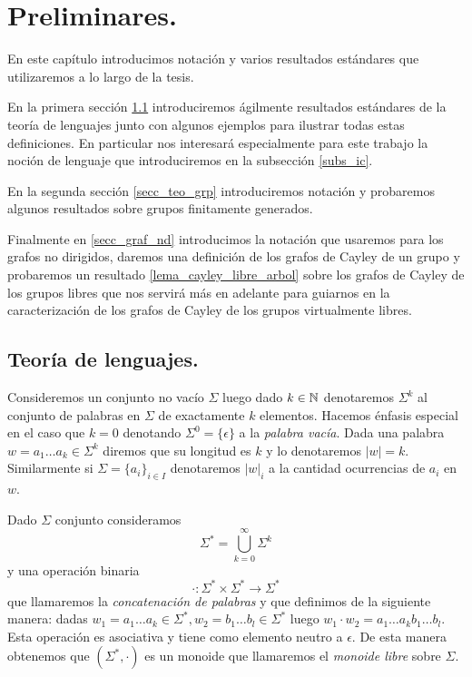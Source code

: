 \documentclass[tesis.tex]{subfiles}
\begin{document}
\chapter{Preliminares.}


En este capítulo introducimos notación y varios resultados estándares que utilizaremos a lo largo de la tesis.

En la primera sección \ref{secc_tlen} introduciremos ágilmente resultados estándares de la teoría de lenguajes junto con algunos ejemplos para ilustrar todas estas definiciones.
En particular nos interesará especialmente para este trabajo la noción de lenguaje \ic que introduciremos en la subsección \ref{subs_ic}. 


En la segunda sección \ref{secc_teo_grp} introduciremos notación y probaremos algunos resultados  sobre grupos finitamente generados. 


Finalmente en \ref{secc_graf_nd} introducimos la notación que usaremos para los grafos no dirigidos, daremos una definición de los grafos de Cayley de un grupo y probaremos un resultado \ref{lema_cayley_libre_arbol} sobre los grafos de Cayley de los grupos libres que nos servirá más en adelante para guiarnos en la caracterización de los grafos de Cayley de los grupos virtualmente libres.


\section{Teoría de lenguajes.}\label{secc_tlen}	


Consideremos un conjunto no vacío $\Sigma$ luego dado $k \in \mathbb{N}$ denotaremos $\Sigma^k$ al conjunto de palabras en $\Sigma$ de exactamente $k$ elementos.
Hacemos énfasis especial en el caso que $k=0$ denotando $\Sigma^0 = \{\epsilon\}$ a la \emph{palabra vacía}.
Dada una palabra $w= a_1 \dots a_k \in \Sigma^k$ diremos que su longitud es $k$ y lo denotaremos $|w| = k$. 
Similarmente si $ \Sigma = \{ a_{i} \}_{i \in I} $ denotaremos $|w|_{i}$ a la cantidad ocurrencias de $a_{i}$ en $w$.



\begin{deff}
	Dado $\Sigma$ conjunto consideramos
	\begin{equation*}
		\Sigma^{*} = \bigcup_{k=0}^{\infty} \Sigma^k
	\end{equation*}
	y una operación binaria
	\[
		\cdot: \Sigma^{*} \times \Sigma^{*} \to \Sigma^{*}
	\]
	que llamaremos la \emph{concatenación de palabras} y que definimos de la siguiente manera: 
	dadas $w_1=a_{1} \dots a_{k} \in \Sigma^{*}, w_2 = b_{1}\dots b_{l}\in \Sigma^{*}$ luego $w_1 \cdot w_2 = a_{1}\dots a_{k}b_{1}\dots b_{l}$.
	Esta operación es asociativa y tiene como elemento neutro a $\epsilon$.
	De esta manera obtenemos que $(\Sigma^{*}, \cdot)$ es un monoide que llamaremos el \emph{monoide libre} sobre $\Sigma$.
\end{deff}
\end{document}

